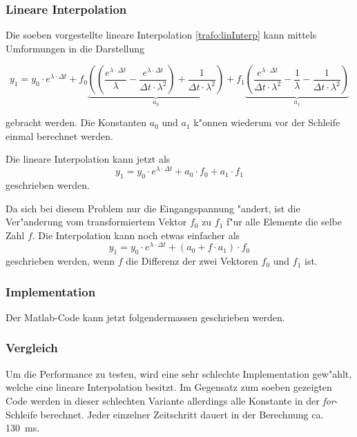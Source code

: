 \begin{refsection}
\subsubsection{Lineare Interpolation}
Die soeben vorgestellte lineare Interpolation \ref{trafo:linInterp} kann mittels Umformungen in die Darstellung 

\begin{equation*}
	y_1 = y_0 \cdot e^{\lambda \cdot \Delta t} + f_0 \underbrace{\left(\left(\frac{e^{\lambda \cdot \Delta t}}{\lambda} - \frac{e^{\lambda \cdot \Delta t}}{\Delta t \cdot \lambda ^2}\right) + \frac{1}{\Delta t \cdot \lambda^2}\right)}_{a_0} + f_1 \underbrace{\left(\frac{e^{\lambda \cdot \Delta t}}{\Delta t \cdot \lambda^2} - \frac{1}{\lambda} - \frac{1}{\Delta t \cdot \lambda^2}\right)}_{a_1}
\end{equation*} 

gebracht werden. Die Konstanten $a_0$ und $a_1$ k"onnen wiederum vor der Schleife einmal berechnet werden. 

Die lineare Interpolation kann jetzt als 
\begin{equation*}
	y_1 = y_0 \cdot e^{\lambda \cdot \Delta t} + a_0 \cdot f_0 + a_1 \cdot f_1
\end{equation*}
geschrieben werden. 

Da sich bei diesem Problem nur die Eingangspannung "andert, ist die Ver"anderung vom transformiertem Vektor $f_0$ zu $f_1$ f"ur alle Elemente die selbe Zahl $f$. Die Interpolation kann noch etwas einfacher als
\begin{equation*}
	y_1 = y_0 \cdot e^{\lambda \cdot \Delta t} + (a_0 + f \cdot  a_1) \cdot f_0
\end{equation*}
geschrieben werden, wenn $f$ die Differenz der zwei Vektoren $f_0$ und $f_1$ ist. 

\subsubsection{Implementation}
Der Matlab-Code kann jetzt folgendermassen geschrieben werden.

{\scriptsize }

\subsubsection{Vergleich}

Um die Performance zu testen, wird eine sehr schlechte Implementation gew"ahlt, welche eine lineare Interpolation besitzt. Im Gegensatz zum soeben gezeigten Code werden in dieser schlechten Variante allerdings alle Konstante in der \textit{for}-Schleife berechnet. Jeder einzelner Zeitschritt dauert in der Berechnung ca. \SI{130}{\milli\second}. 


\end{refsection}
